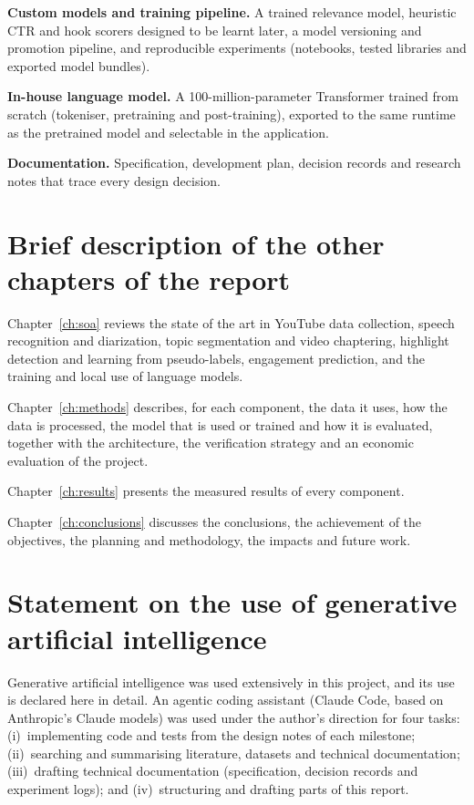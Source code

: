 \documentclass[ENG]{TFUOC}
\begin{document}
\textbf{Custom models and training pipeline.} A trained relevance model, heuristic CTR and hook scorers designed to be learnt later, a model versioning and promotion pipeline, and reproducible experiments (notebooks, tested libraries and exported model bundles).

\textbf{In-house language model.} A 100-million-parameter Transformer trained from scratch (tokeniser, pretraining and post-training), exported to the same runtime as the pretrained model and selectable in the application.

\textbf{Documentation.} Specification, development plan, decision records and research notes that trace every design decision.

\section{Brief description of the other chapters of the report}

Chapter~\ref{ch:soa} reviews the state of the art in YouTube data collection, speech recognition and diarization, topic segmentation and video chaptering, highlight detection and learning from pseudo-labels, engagement prediction, and the training and local use of language models.

Chapter~\ref{ch:methods} describes, for each component, the data it uses, how the data is processed, the model that is used or trained and how it is evaluated, together with the architecture, the verification strategy and an economic evaluation of the project.

Chapter~\ref{ch:results} presents the measured results of every component.

Chapter~\ref{ch:conclusions} discusses the conclusions, the achievement of the objectives, the planning and methodology, the impacts and future work.

\section{Statement on the use of generative artificial intelligence}
\label{s:genai}

Generative artificial intelligence was used extensively in this project, and its use is declared here in detail. An agentic coding assistant (Claude Code, based on Anthropic's Claude models) was used under the author's direction for four tasks: (i)~implementing code and tests from the design notes of each milestone; (ii)~searching and summarising literature, datasets and technical documentation; (iii)~drafting technical documentation (specification, decision records and experiment logs); and (iv)~structuring and drafting parts of this report.
\end{document}
